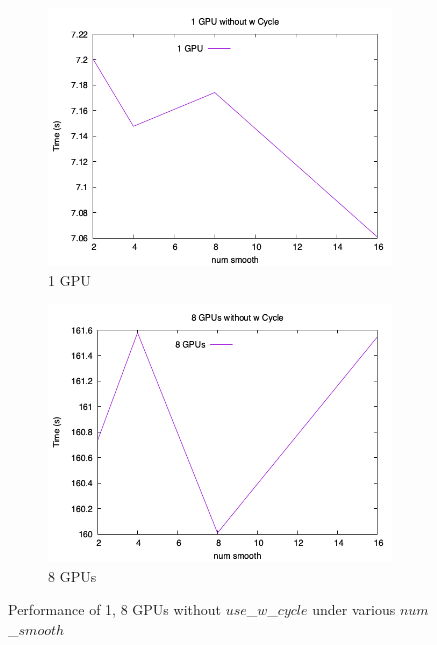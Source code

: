 \documentclass{article}
\begin{document}
\begin{figure}[H]
    \begin{subfigure}{0.48\textwidth}
        \includegraphics[width=\textwidth]{1 GPU without w Cycle.png}
        \caption{1 GPU}
        \label{fig:1 GPU without w Cycle}
    \end{subfigure}
    \begin{subfigure}[b]{0.48\textwidth}
        \includegraphics[width=\textwidth]{8 GPUs without w Cycle.png}
        \caption{8 GPUs}
        \label{fig:8 GPUs without w Cycle}
    \end{subfigure}
    \caption{Performance of 1, 8 GPUs without $use$\_$w$\_$cycle$ under various $num$\_$smooth$}
\end{figure}
\end{document}

